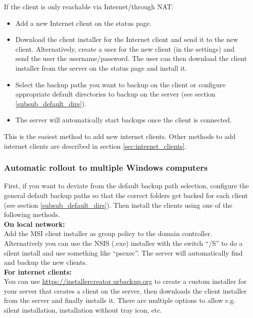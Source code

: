 \documentclass[a4paper,10pt]{article}
\begin{document}
\noindent If the client is only reachable via Internet/through NAT:

\begin{itemize}
  \item Add a new Internet client on the status page.
  \item Download the client installer for the Internet client and send it to the new client. Alternatively, create a user for the new client (in the settings) and send the user the username/password. The user can then download the client installer from the server on the status page and install it.
  \item Select the backup paths you want to backup on the client or configure appropriate default directories to backup on the server (see section \ref{subsub_default_dirs}).
  \item The server will automatically start backups once the client is connected.
\end{itemize}

\noindent This is the easiest method to add new internet clients. Other methods to add internet clients are described in section \ref{sec:internet_clients}.

\subsubsection{Automatic rollout to multiple Windows computers}

First, if you want to deviate from the default backup path selection, configure the general default backup paths so that the correct folders get backed for each client (see section \ref{subsub_default_dirs}). Then install the clients using one of the following methods.\\ 

\noindent \textbf{On local network:}\\

\noindent Add the MSI client installer as group policy to the domain controller. Alternatively you can use the NSIS (.exe) installer with the switch ``/S'' to do a silent install and use something like ``psexec''. The server will automatically find and backup the new clients.\\

\noindent \textbf{For internet clients:}\\

\noindent You can use \url{https://installercreator.urbackup.org} to create a custom installer for your server that creates a client on the server,
then downloads the client installer from the server and finally installs it. There are multiple options to allow e.g. silent installation, installation without tray
icon, etc.
\end{document}
